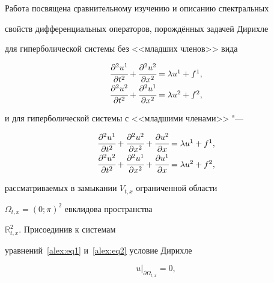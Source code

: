 Работа посвящена сравнительному изучению и описанию спектральных

свойств дифференциальных операторов, порождённых задачей Дирихле

для  гиперболической системы без <<младших членов>> вида

\begin{equation}

\label{alex:eq1}

\begin{array}{l}

\cfrac{\partial^2{u^1}}{\partial{t}^2}+\cfrac{\partial^2{u^2}}{\partial{x}^2} = \lambda{u^1}+f^1, \\[2mm]

\cfrac{\partial^2{u^2}}{\partial{t}^2}+\cfrac{\partial^2{u^1}}{\partial{x}^2}

= \lambda{u^2}+ f^2,

\end{array}

\end{equation}

и для гиперболической системы с <<младшими членами>> "---

\begin{equation}

\label{alex:eq2}

\begin{array}{l}

\cfrac{\partial^2{u^1}}{\partial{t}^2}+\cfrac{\partial^2{u^2}}{\partial{x}^2}+\cfrac{\partial{u^2}}{\partial{x}}

=\lambda{u^1}+f^1, \\[2mm]

\cfrac{\partial^2{u^2}}{\partial{t}^2}+\cfrac{\partial^2{u^1}}{\partial{x}^2}+\cfrac{\partial{u^1}}{\partial{x}}

= \lambda{u^2}+ f^2,

\end{array}

\end{equation}

рассматриваемых в замыкании $V_{t,x}$ ограниченной области

$\Omega_{t,x}=(0;\pi)^2$ евклидова пространства

$\mathbb{R}^2_{t,x}.$ Присоединив к системам

уравнений~\eqref{alex:eq1} и~\eqref{alex:eq2}  условие Дирихле

\begin{equation}\label{alex:eq3}

u \big|_{\partial\Omega_{t,x}}=0,

\end{equation}

